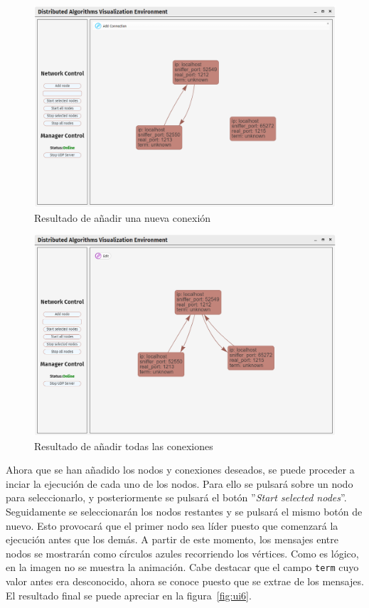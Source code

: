 \begin{figure}[!htb]
  \centering
  \includegraphics[width=0.9\linewidth]{imagenes/ui4}
  \caption{Resultado de añadir una nueva conexión}
  \label{fig:ui4}
\end{figure}

\begin{figure}[!htb]
  \centering
  \includegraphics[width=0.9\linewidth]{imagenes/ui5}
  \caption{Resultado de añadir todas las conexiones}
  \label{fig:ui5}
\end{figure}

Ahora que se han añadido los nodos y conexiones deseados, se puede proceder a inciar la ejecución de cada uno de los nodos. Para ello se pulsará sobre un nodo para seleccionarlo, y posteriormente se pulsará el botón ''\textit{Start selected nodes}''. Seguidamente se seleccionarán los nodos restantes y se pulsará el mismo botón de nuevo. Esto provocará que el primer nodo sea líder puesto que comenzará la ejecución antes que los demás. A partir de este momento, los mensajes entre nodos se mostrarán como círculos azules recorriendo los vértices. Como es lógico, en la imagen no se muestra la animación. Cabe destacar que el campo \texttt{term} cuyo valor antes era desconocido, ahora se conoce puesto que se extrae de los mensajes. El resultado final se puede apreciar en la figura~\ref{fig:ui6}.

